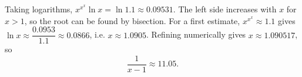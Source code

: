 Taking logarithms, $x^{x^x}\ln x=\ln1.1\approx0.09531$. The left side increases with $x$ for $x>1$, so the root can be found by bisection. For a first estimate, $x^{x^x}\approx1.1$ gives $\ln x\approx\dfrac{0.0953}{1.1}\approx0.0866$, i.e. $x\approx1.0905$. Refining numerically gives $x\approx1.090517$, so
\[\dfrac1{x-1}\approx\boxed{11.05}.\]
